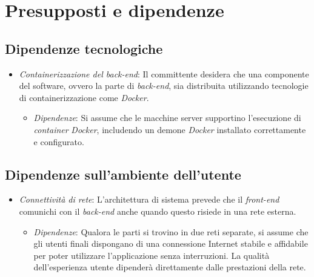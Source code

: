 \section{Presupposti e dipendenze}

\subsection{Dipendenze tecnologiche}
\begin{itemize}
  \item \textit{Containerizzazione del back-end}: Il committente desidera che una componente del software, ovvero la parte di \textit{back-end}, sia distribuita utilizzando tecnologie di containerizzazione come \textit{Docker}.

  \begin{itemize}
  \item \textit{Dipendenze}: Si assume che le macchine server supportino l'esecuzione di \textit{container} \textit{Docker}, includendo un demone \textit{Docker} installato correttamente e configurato.    
\end{itemize}
\end{itemize}

\subsection{Dipendenze sull'ambiente dell'utente}
\begin{itemize}
  \item \textit{Connettività di rete}: L'architettura di sistema prevede 
  che il \textit{front-end} comunichi con il \textit{back-end} anche 
  quando questo risiede in una rete esterna.
  \begin{itemize}
  \item \textit{Dipendenze}: Qualora le parti si trovino in due reti separate, 
  si assume che gli utenti finali dispongano 
  di una connessione Internet stabile e affidabile per poter utilizzare 
  l'applicazione senza interruzioni. La qualità dell'esperienza utente 
  dipenderà direttamente dalle prestazioni della rete.
\end{itemize}
\end{itemize}
